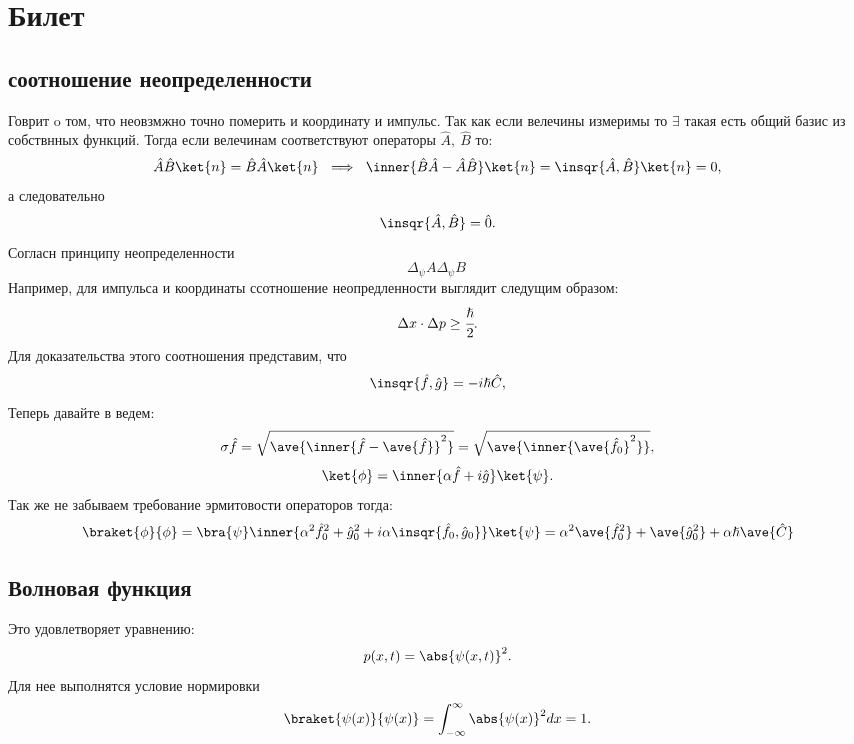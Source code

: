 \section{Билет}
\subsection{соотношение неопределенности}
Говрит o том, что неовзмжно точно померить и координату и импульс.
 Так как если велечины измеримы то $\exists$ такая есть общий базис 
 из собствнных функций. Тогда если велечинам соответствуют 
 операторы $\hat A,\ \hat B$ то:
\begin{equation*} 
 \hat A \hat B \ket{n} = \hat B \hat A  \ket{n} \ \implies\ 
 \inner{\hat B \hat A - \hat A \hat B} \ket{n} = 
 \insqr{\hat A, \hat B}\ket{n} = 0,
\end{equation*}
а следовательно 
\begin{equation} \label{eq:1}
 \insqr{\hat A, \hat B} = \hat 0.
\end{equation} 
Согласн принципу неопределенности
\begin{equation} 
 \Delta_{\psi} A \Delta_{\psi} B \  
\end{equation} 
Например, для импульса и координаты ссотношение неопредленности 
выглядит следущим образом:
\begin{equation} 
 \Delta x \cdot \Delta p \geq \cfrac{\hslash}{2}.
\end{equation} 
Для доказательства этого соотношения представим, что
\begin{equation} 
 \insqr{\hat f, \hat g} = - i \hslash \hat C,
\end{equation}  
Теперь давайте в ведем:
\begin{equation} 
  \sigma \hat f = \sqrt{\ave{\inner{\hat f - \ave{\hat f}}^2 }} = \sqrt{\ave{\inner{ \ave{\hat f_0}^2 }}},
\end{equation} 
\begin{equation} 
 \ket{\phi } = \inner{\alpha \hat f + i \hat g }\ket{\psi}.
\end{equation} 
Так же не забываем требование эрмитовости операторов тогда:
\begin{equation} 
 \braket{\phi}{\phi} = \bra{\psi} \inner{\alpha^2 \hat f_0^2 + \hat g_0^2 + i\alpha \insqr{\hat f_0, \hat g_0}} \ket{\psi} = 
 \alpha^2 \ave{\hat f_0^2} +  \ave{ \hat g_0^2} + \alpha \hslash \ave{\hat C}
\end{equation} 

\subsection{Волновая функция}
Это удовлетворяет уравнению:
\begin{equation} 
 p (x, t) = \abs{\psi (x, t)}^2.
\end{equation} 
Для нее выполнятся условие нормировки 
\begin{equation} 
 \braket{\psi (x)}{\psi (x)} = \int_{-\infty}^{\infty} 
  \abs{\psi (x)}^2 dx = 1.
\end{equation} 
   
